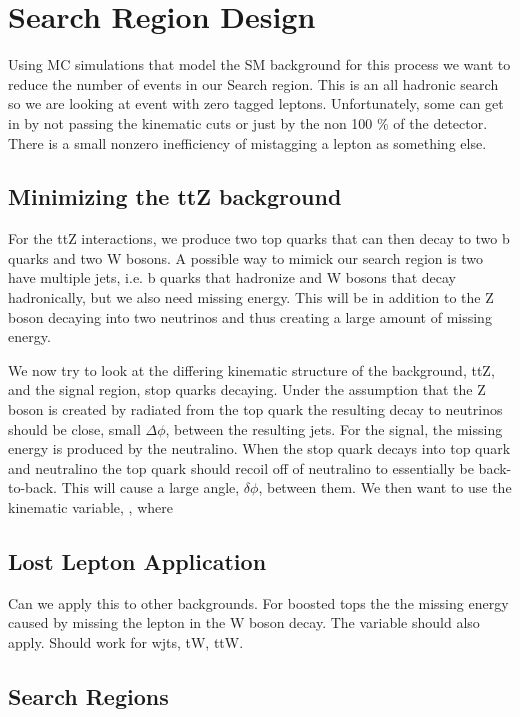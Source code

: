 \chapter{Search Region Design}
\label{ch:SR}

Using MC simulations that model the SM background for this process we want to reduce the number of events in our Search region. This is an all hadronic search so we are looking at event with zero tagged leptons. Unfortunately, some can get in by not passing the kinematic cuts or just by the non 100 \% of the detector. There is a small nonzero inefficiency of mistagging a lepton as something else. 

\section{Minimizing the ttZ background}
\label{sec:ttZBack}

For the ttZ interactions, we produce two top quarks that can then decay to two b quarks and two W bosons. A possible way to mimick our search region is two have multiple jets, i.e. b quarks that hadronize and W bosons that decay hadronically, but we also need missing energy. This will be in addition to the Z boson decaying into two neutrinos and thus creating a large amount of missing energy.

We now try to look at the differing kinematic structure of the background, ttZ, and the signal region, stop quarks decaying. Under the assumption that the Z boson is created by radiated from the top quark the resulting decay to neutrinos should be close, small $\Delta\phi$, between the resulting jets. For the signal, the missing energy is produced by the neutralino. When the stop quark decays into top quark and neutralino the top quark should recoil off of neutralino to essentially be back-to-back. This will cause a large angle, $\delta\phi$, between them. We then want to use the kinematic variable, \dphisr, where 

\section{Lost Lepton Application}
\label{sec:ttbarsr}

Can we apply this to other backgrounds. For boosted tops the the missing energy caused by missing the lepton in the W boson decay. The variable \dphisr should also apply. Should work for wjts, tW, ttW.

\section{Search Regions}
\label{sec:SR}

